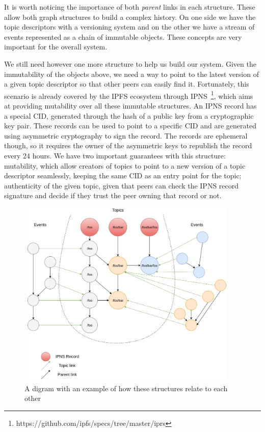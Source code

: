 It is worth noticing the importance of both \emph{parent} links in each
structure. These allow both graph structures to build a complex history.
On one side we have the topic descriptors with a versioning system and
on the other we have a stream of events represented as a chain of
immutable objects. These concepts are very important for the overall
system.

We still need however one more structure to help us build our system.
Given the immutability of the objects above, we need a way to point to
the latest version of a given topic descriptor so that other peers can
easily find it. Fortunately, this scenario is already covered by the
IPFS ecosystem through IPNS~\footnote{https://github.com/ipfs/specs/tree/master/iprs}, which aims at
providing mutability over all these immutable structures. An IPNS record
has a special CID, generated through the hash of a public key from a
cryptographic key pair. These records can be used to point to a specific
CID and are generated using asymmetric cryptography to sign the record.
The records are ephemeral though, so it requires the owner of the
asymmetric keys to republish the record every 24 hours. We have two
important guarantees with this structure: mutability, which allow
creators of topics to point to a new version of a topic descriptor
seamlessly, keeping the same CID as an entry point for the topic;
authenticity of the given topic, given that peers can check the IPNS
record signature and decide if they trust the peer owning that record or
not.

\begin{figure}[hb!]
  \centering
  \includegraphics[max height=9cm,max width=0.95\textwidth]{img/solution-arch.png}
  \caption{A digram with an example of how these structures relate to each other}
  \label{fig:solution-arch}
\end{figure}

